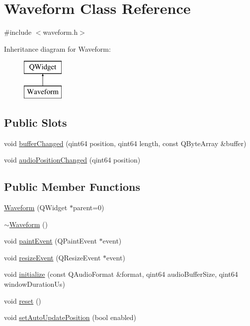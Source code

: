 \hypertarget{class_waveform}{}\section{Waveform Class Reference}
\label{class_waveform}


{\ttfamily \#include $<$waveform.\+h$>$}

Inheritance diagram for Waveform\+:\begin{figure}[H]
\begin{center}
\leavevmode
\includegraphics[height=2.000000cm]{class_waveform}
\end{center}
\end{figure}
\subsection*{Public Slots}
\begin{DoxyCompactItemize}
\item 
void \hyperlink{class_waveform_ae4dc908754aa8290280b60b14af11728}{buffer\+Changed} (qint64 position, qint64 length, const Q\+Byte\+Array \&buffer)
\item 
void \hyperlink{class_waveform_a3f6b6306fc0da548a763bf41d523fe28}{audio\+Position\+Changed} (qint64 position)
\end{DoxyCompactItemize}
\subsection*{Public Member Functions}
\begin{DoxyCompactItemize}
\item 
\hyperlink{class_waveform_a20e3236d7e3d215fcddd51062fcff350}{Waveform} (Q\+Widget $\ast$parent=0)
\item 
\hyperlink{class_waveform_af4f2ae8b1749306657602b53a8ab90df}{$\sim$\+Waveform} ()
\item 
void \hyperlink{class_waveform_a0c3a57dd99d9d203c1bfd846d639939f}{paint\+Event} (Q\+Paint\+Event $\ast$event)
\item 
void \hyperlink{class_waveform_a3d814bfdf6ec4d47e80e34685c2fa464}{resize\+Event} (Q\+Resize\+Event $\ast$event)
\item 
void \hyperlink{class_waveform_a0abffebbd2efcd6047137095f99a97f1}{initialize} (const Q\+Audio\+Format \&format, qint64 audio\+Buffer\+Size, qint64 window\+Duration\+Us)
\item 
void \hyperlink{class_waveform_ae97ba3abb25987f5df0b237850be5ec7}{reset} ()
\item 
void \hyperlink{class_waveform_aa57d2fa418d6ac920de5b81e8ec9e6fc}{set\+Auto\+Update\+Position} (bool enabled)
\end{DoxyCompactItemize}


